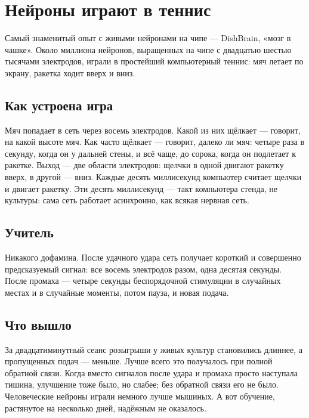 \chapter{Нейроны играют в теннис}

Самый знаменитый опыт с живыми нейронами на чипе --- DishBrain, «мозг в чашке». Около миллиона нейронов, выращенных на чипе с двадцатью шестью тысячами электродов, играли в простейший компьютерный теннис: мяч летает по экрану, ракетка ходит вверх и вниз.

\section*{Как устроена игра}

Мяч попадает в сеть через восемь электродов. Какой из них щёлкает --- говорит, на какой высоте мяч. Как часто щёлкает --- говорит, далеко ли мяч: четыре раза в секунду, когда он у дальней стены, и всё чаще, до сорока, когда он подлетает к ракетке. Выход --- две области электродов: щелчки в одной двигают ракетку вверх, в другой --- вниз. Каждые десять миллисекунд компьютер считает щелчки и двигает ракетку. Эти десять миллисекунд --- такт компьютера стенда, не культуры: сама сеть работает асинхронно, как всякая нервная сеть.


\section*{Учитель}

Никакого дофамина. После удачного удара сеть получает короткий и совершенно предсказуемый сигнал: все восемь электродов разом, одна десятая секунды. После промаха --- четыре секунды беспорядочной стимуляции в случайных местах и в случайные моменты, потом пауза, и новая подача.

\section*{Что вышло}

За двадцатиминутный сеанс розыгрыши у живых культур становились длиннее, а пропущенных подач --- меньше. Лучше всего это получалось при полной обратной связи. Когда вместо сигналов после удара и промаха просто наступала тишина, улучшение тоже было, но слабее; без обратной связи его не было. Человеческие нейроны играли немного лучше мышиных. А вот обучение, растянутое на несколько дней, надёжным не оказалось.

